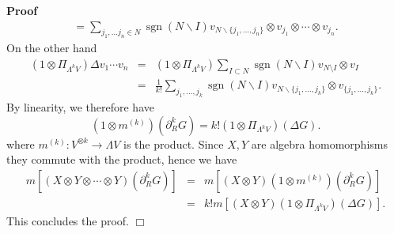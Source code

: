 \documentclass[11pt]{article}
\newcommand{\tmop}[1]{\ensuremath{\operatorname{#1}}}
\newenvironment{proof}{\noindent\textbf{Proof\ }}{\hspace*{\fill}$\Box$\medskip}
\begin{document}
\begin{proof}
\[\begin{array}{c}
       = \sum_{j_1, \ldots j_n \in N} \tmop{sgn} (N\backslash I)
       v_{N\backslash \{ j_1, \ldots, j_n \}} \otimes v_{j_1} \otimes \cdots
       \otimes v_{j_n} .
     \end{array} \]
  On the other hand
  \[ \begin{array}{lll}
       (1 \otimes \Pi_{\Lambda^k V}) \Delta v_1 \cdots v_n & = & (1 \otimes
       \Pi_{\Lambda^k V}) \sum_{I \subset N} \tmop{sgn} (N\backslash I) v_{N
       \setminus I} \otimes v_I\\
       & = & \frac{1}{k!} \sum_{j_1, \ldots, j_k} \tmop{sgn} (N\backslash I)
       v_{N\backslash \{ j_1, \ldots, j_k \}} \otimes v_{\{ j_1, \ldots, j_k
       \}} .
     \end{array} \]
  By linearity, we therefore have
  \[ (1 \otimes m^{(k)}) (\partial^k_R G) = k! (1 \otimes \Pi_{\Lambda^k V})
     (\Delta G) . \]
  where $m^{(k)} : V^{\otimes k} \rightarrow \Lambda V$ is the product. Since
  $X, Y$ are algebra homomorphisms they commute with the product, hence we
  have
  \begin{eqnarray*}
    m [(X \otimes Y \otimes \cdots \otimes Y) (\partial_R^k G)] & = & m [(X
    \otimes Y) (1 \otimes m^{(k)}) (\partial_R^k G)]\\
    & = & k!m [(X \otimes Y) (1 \otimes \Pi_{\Lambda^k V}) (\Delta G)] .
  \end{eqnarray*}
  This concludes the proof.
\end{proof}
\end{document}
